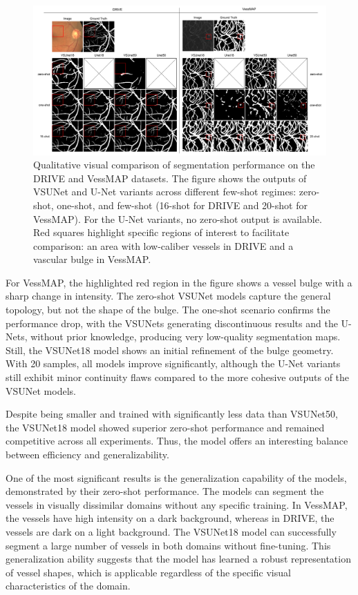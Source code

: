 \documentclass[%
reprint,
nofootinbib,
 amsmath,amssymb,
aps,
superscriptaddress,
showkeys,
longbibliography
]{revtex4-1}
\begin{document}
\begin{figure}[tbp]
    \centering
    \includegraphics[width=\textwidth]{figures/results/results_fewshots.pdf}
    \caption{Qualitative visual comparison of segmentation performance on the DRIVE and VessMAP datasets. The figure shows the outputs of VSUNet and U-Net variants across different few-shot regimes: zero-shot, one-shot, and few-shot (16-shot for DRIVE and 20-shot for VessMAP). For the U-Net variants, no zero-shot output is available. Red squares highlight specific regions of interest to facilitate comparison: an area with low-caliber vessels in DRIVE and a vascular bulge in VessMAP.}
    \label{f:results_fewshots_drive}
\end{figure}

For VessMAP, the highlighted red region in the figure shows a vessel bulge with a sharp change in intensity. The zero-shot VSUNet models capture the general topology, but not the shape of the bulge. The one-shot scenario confirms the performance drop, with the VSUNets generating discontinuous results and the U-Nets, without prior knowledge, producing very low-quality segmentation maps. Still, the VSUNet18 model shows an initial refinement of the bulge geometry. With 20 samples, all models improve significantly, although the U-Net variants still exhibit minor continuity flaws compared to the more cohesive outputs of the VSUNet models.

Despite being smaller and trained with significantly less data than VSUNet50, the VSUNet18 model showed superior zero-shot performance and remained competitive across all experiments. Thus, the model offers an interesting balance between efficiency and generalizability.

One of the most significant results is the generalization capability of the models, demonstrated by their zero-shot performance. The models can segment the vessels in visually dissimilar domains without any specific training. In VessMAP, the vessels have high intensity on a dark background, whereas in DRIVE, the vessels are dark on a light background. The VSUNet18 model can successfully segment a large number of vessels in both domains without fine-tuning. This generalization ability suggests that the model has learned a robust representation of vessel shapes, which is applicable regardless of the specific visual characteristics of the domain.
\end{document}
